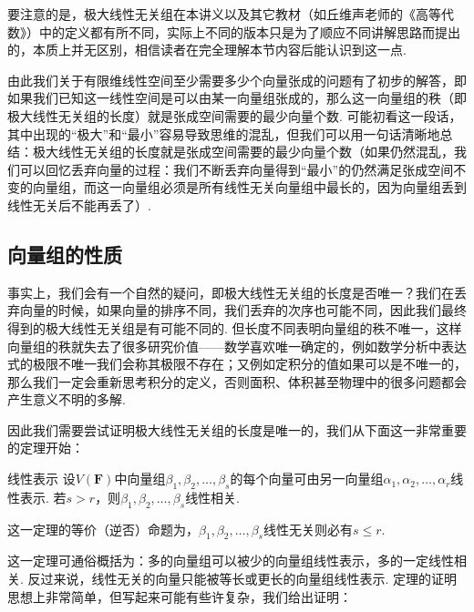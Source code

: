 要注意的是，极大线性无关组在本讲义以及其它教材（如丘维声老师的《高等代数》）中的定义都有所不同，实际上不同的版本只是为了顺应不同讲解思路而提出的，本质上并无区别，相信读者在完全理解本节内容后能认识到这一点.

由此我们关于有限维线性空间至少需要多少个向量张成的问题有了初步的解答，即如果我们已知这一线性空间是可以由某一向量组张成的，那么这一向量组的秩（即极大线性无关组的长度）就是张成空间需要的最少向量个数. 可能初看这一段话，其中出现的``极大''和``最小''容易导致思维的混乱，但我们可以用一句话清晰地总结：极大线性无关组的长度就是张成空间需要的最少向量个数（如果仍然混乱，我们可以回忆丢弃向量的过程：我们不断丢弃向量得到``最小''的仍然满足张成空间不变的向量组，而这一向量组必须是所有线性无关向量组中最长的，因为向量组丢到线性无关后不能再丢了）.

\subsection{向量组的性质}

事实上，我们会有一个自然的疑问，即极大线性无关组的长度是否唯一？我们在丢弃向量的时候，如果向量的排序不同，我们丢弃的次序也可能不同，因此我们最终得到的极大线性无关组是有可能不同的. 但长度不同表明向量组的秩不唯一，这样向量组的秩就失去了很多研究价值——数学喜欢唯一确定的，例如数学分析中表达式的极限不唯一我们会称其极限不存在；又例如定积分的值如果可以是不唯一的，那么我们一定会重新思考积分的定义，否则面积、体积甚至物理中的很多问题都会产生意义不明的多解.

因此我们需要尝试证明极大线性无关组的长度是唯一的，我们从下面这一非常重要的定理开始：
\begin{theorem}{}{线性表示}
    设$V(\mathbf{F})$中向量组$ \beta_1,\beta_2,\ldots,\beta_s $的每个向量可由另一向量组$\alpha_1,\alpha_2,\ldots,\alpha_r$线性表示. 若$s>r$，则$ \beta_1,\beta_2,\ldots,\beta_s $线性相关.
\end{theorem}
这一定理的等价（逆否）命题为，$ \beta_1,\beta_2,\ldots,\beta_s $线性无关则必有$s\leqslant r$.

这一定理可通俗概括为：多的向量组可以被少的向量组线性表示，多的一定线性相关. 反过来说，线性无关的向量只能被等长或更长的向量组线性表示. 定理的证明思想上非常简单，但写起来可能有些许复杂，我们给出证明：

